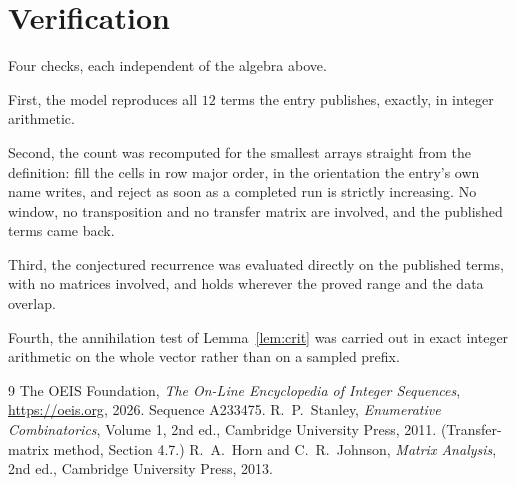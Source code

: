 \documentclass[11pt,a4paper]{article}
\theoremstyle{plain}
\theoremstyle{definition}
\begin{document}
\section{Verification}

Four checks, each independent of the algebra above.

First, the model reproduces all $12$ terms the entry publishes, exactly, in integer
arithmetic.

Second, the count was recomputed for the smallest arrays straight from the definition: fill the
cells in row major order, in the orientation the entry's own name writes, and reject as soon as
a completed run is strictly increasing. No window, no transposition and no transfer matrix are involved, and
the published terms came back.

Third, the conjectured recurrence was evaluated directly on the published terms, with no
matrices involved, and holds wherever the proved range and the data overlap.

Fourth, the annihilation test of Lemma~\ref{lem:crit} was carried out in exact integer
arithmetic on the whole vector rather than on a sampled prefix.

\begin{thebibliography}{9}
 The OEIS Foundation, \emph{The On-Line Encyclopedia of Integer
Sequences}, \url{https://oeis.org}, 2026. Sequence A233475.
 R.~P.~Stanley, \emph{Enumerative Combinatorics}, Volume 1, 2nd ed.,
Cambridge University Press, 2011. (Transfer-matrix method, Section 4.7.)
 R.~A.~Horn and C.~R.~Johnson, \emph{Matrix Analysis}, 2nd ed., Cambridge
University Press, 2013.
\end{thebibliography}
\end{document}
